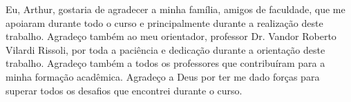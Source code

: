 \begin{agradecimentos}

    Eu, Arthur, gostaria de agradecer a minha família, amigos de faculdade, que me apoiaram durante todo o curso e principalmente durante a realização deste trabalho. Agradeço também ao meu orientador, professor Dr. Vandor Roberto Vilardi Rissoli, por toda a paciência e dedicação durante a orientação deste trabalho. Agradeço também a todos os professores que contribuíram para a minha formação acadêmica. Agradeço a Deus por ter me dado forças para superar todos os desafios que encontrei durante o curso.
    
    
    \end{agradecimentos}